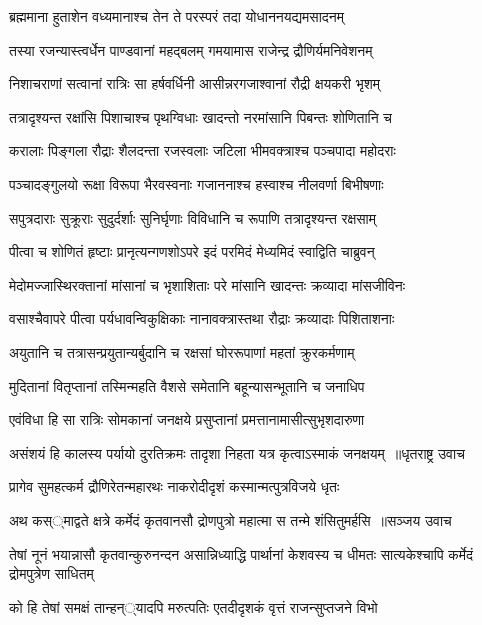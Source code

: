 \twolineshloka
{ब्रह्ममाना हुताशेन वध्यमानाश्च तेन ते}
{परस्परं तदा योधाननयद्यमसादनम्}


\twolineshloka
{तस्या रजन्यास्त्वर्धेन पाण्डवानां महद्बलम्}
{गमयामास राजेन्द्र द्रौणिर्यमनिवेशनम्}


\twolineshloka
{निशाचराणां सत्वानां रात्रिः सा हर्षवर्धिनी}
{आसीन्नरगजाश्वानां रौद्री क्षयकरी भृशम्}


\twolineshloka
{तत्रादृश्यन्त रक्षांसि पिशाचाश्च पृथग्विधाः}
{खादन्तो नरमांसानि पिबन्तः शोणितानि च}


\twolineshloka
{करालाः पिङ्गला रौद्राः शैलदन्ता रजस्वलाः}
{जटिला भीमवक्त्राश्च पञ्चपादा महोदराः}


\twolineshloka
{पञ्चादङ्गुलयो रूक्षा विरूपा भैरवस्वनाः}
{गजाननाश्च हस्वाश्च नीलवर्णा बिभीषणाः}


\twolineshloka
{सपुत्रदाराः सुक्रूराः सुदुर्दर्शाः सुनिर्घृणाः}
{विविधानि च रूपाणि तत्रादृश्यन्त रक्षसाम्}


\twolineshloka
{पीत्वा च शोणितं हृष्टाः प्रानृत्यन्गणशोऽपरे}
{इदं परमिदं मेध्यमिदं स्वाद्विति चाब्रुवन्}


\twolineshloka
{मेदोमज्जास्थिरक्तानां मांसानां च भृशाशिताः}
{परे मांसानि खादन्तः क्रव्यादा मांसजीविनः}


\twolineshloka
{वसाश्चैवापरे पीत्वा पर्यधावन्विकुक्षिकाः}
{नानावक्त्रास्तथा रौद्राः क्रव्यादाः पिशिताशनाः}


\twolineshloka
{अयुतानि च तत्रासन्प्रयुतान्यर्बुदानि च}
{रक्षसां घोररूपाणां महतां क्रुरकर्मणाम्}


\threelineshloka
{मुदितानां वितृप्तानां तस्मिन्महति वैशसे}
{समेतानि बहून्यासन्भूतानि च जनाधिप}
{}


\twolineshloka
{एवंविधा हि सा रात्रिः सोमकानां जनक्षये}
{प्रसुप्तानां प्रमत्तानामासीत्सुभृशदारुणा}


\threelineshloka
{असंशयं हि कालस्य पर्यायो दुरतिक्रमः}
{तादृशा निहता यत्र कृत्वाऽस्माकं जनक्षयम् ॥धृतराष्ट्र उवाच}
{}


\twolineshloka
{प्रागेव सुमहत्कर्म द्रौणिरेतन्महारथः}
{नाकरोदीदृशं कस्मान्मत्पुत्रविजये धृतः}


\threelineshloka
{अथ कस््माद्वते क्षत्रे कर्मेदं कृतवानसौ}
{द्रोणपुत्रो महात्मा स तन्मे शंसितुमर्हसि ॥सञ्जय उवाच}
{}


\threelineshloka
{तेषां नूनं भयान्नासौ कृतवान्कुरुनन्दन}
{असान्निध्याद्धि पार्थानां केशवस्य च धीमतः}
{सात्यकेश्चापि कर्मेदं द्रोमपुत्रेण साधितम्}


\twolineshloka
{को हि तेषां समक्षं तान्हन््यादपि मरुत्पतिः}
{एतदीदृशकं वृत्तं राजन्सुप्तजने विभो}


